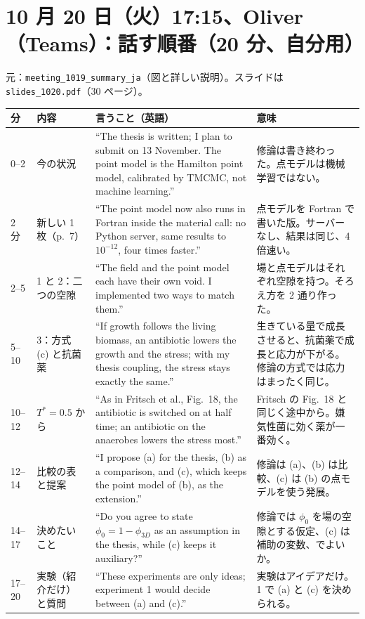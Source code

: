 \documentclass[11pt,a4paper]{article}
\begin{document}
\section*{10 月 20 日（火）17:15、Oliver（Teams）：話す順番（20 分、自分用）}
{\small 元：\texttt{meeting\_1019\_summary\_ja}（図と詳しい説明）。スライドは \texttt{slides\_1020.pdf}（30 ページ）。}

\medskip
\begin{tabularx}{\linewidth}{@{}l l X X@{}}
\toprule
分 & 内容 & 言うこと（英語） & 意味\\
\midrule
0--2 & 今の状況 & ``The thesis is written; I plan to submit on 13 November. The point model is the Hamilton point model, calibrated by TMCMC, not machine learning.'' & 修論は書き終わった。点モデルは機械学習ではない。\\
2 分 & 新しい 1 枚（p.~7） & ``The point model now also runs in Fortran inside the material call: no Python server, same results to $10^{-12}$, four times faster.'' & 点モデルを Fortran で書いた版。サーバーなし、結果は同じ、4 倍速い。\\
2--5 & 1 と 2：二つの空隙 & ``The field and the point model each have their own void. I implemented two ways to match them.'' & 場と点モデルはそれぞれ空隙を持つ。そろえ方を 2 通り作った。\\
5--10 & 3：方式 (c) と抗菌薬 & ``If growth follows the living biomass, an antibiotic lowers the growth and the stress; with my thesis coupling, the stress stays exactly the same.'' & 生きている量で成長させると、抗菌薬で成長と応力が下がる。修論の方式では応力はまったく同じ。\\
10--12 & $T^*=0.5$ から & ``As in Fritsch et al., Fig.~18, the antibiotic is switched on at half time; an antibiotic on the anaerobes lowers the stress most.'' & Fritsch の Fig.~18 と同じく途中から。嫌気性菌に効く薬が一番効く。\\
12--14 & 比較の表と提案 & ``I propose (a) for the thesis, (b) as a comparison, and (c), which keeps the point model of (b), as the extension.'' & 修論は (a)、(b) は比較、(c) は (b) の点モデルを使う発展。\\
14--17 & 決めたいこと & ``Do you agree to state $\phi_0 = 1-\phi_{3D}$ as an assumption in the thesis, while (c) keeps it auxiliary?'' & 修論では $\phi_0$ を場の空隙とする仮定、(c) は補助の変数、でよいか。\\
17--20 & 実験（紹介だけ）と質問 & ``These experiments are only ideas; experiment 1 would decide between (a) and (c).'' & 実験はアイデアだけ。1 で (a) と (c) を決められる。\\
\bottomrule
\end{tabularx}
\end{document}
